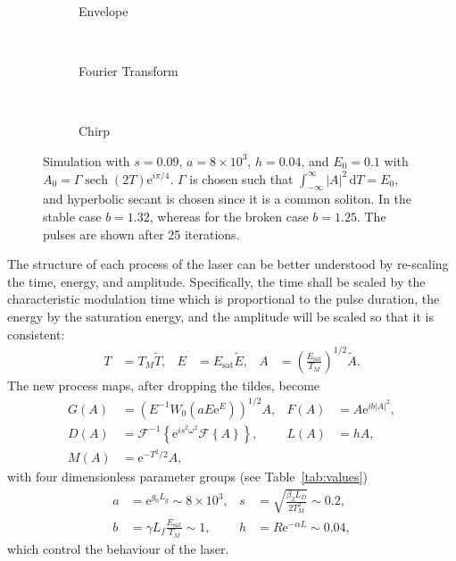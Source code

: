 \documentclass[%
 aps,
 jmp,%
 amsmath,amssymb,
 reprint,%
nofootinbib
]{revtex4-1}
\newcommand{\Es}{E_{\textrm{sat}}}
\newcommand{\FT}[1]{\mathcal{F}\left\{ #1 \right\}}
\newcommand{\FTi}[1]{\mathcal{F}^{-1}\left\{ #1 \right\}}
\DeclareMathOperator{\sech}{sech}
\begin{document}
\begin{figure}[tbp]
\centering
\begin{subfigure}[]{\columnwidth}

\caption{Envelope}
\label{fig:envelope}
\end{subfigure} \\
\begin{subfigure}[]{\columnwidth}

\caption{Fourier Transform}
\label{fig:fourier}
\end{subfigure} \\
\begin{subfigure}[]{\columnwidth}

\caption{Chirp}
\end{subfigure}
\caption{Simulation with $s = 0.09$, $a = 8 \times 10^3$, $h = 0.04$, and $E_0 = 0.1$ with $A_0 = \Gamma \sech{(2T)} \textrm{e}^{i \pi / 4}$. $\Gamma$ is chosen such that $\int_{-\infty}^\infty |A|^2 \, \textrm{d}T = E_0$, and hyperbolic secant is chosen since it is a common soliton. In the stable case $b = 1.32$, whereas for the broken case $b = 1.25$. The pulses are shown after 25 iterations.}
\label{fig:pulse}
\end{figure}

The structure of each process of the laser can be better understood by re-scaling the time, energy, and amplitude. Specifically, the time shall be scaled by the characteristic modulation time which is proportional to the pulse duration, the energy by the saturation energy, and the amplitude will be scaled so that it is consistent:
\begin{align*}
	T &= T_M \widetilde{T},& E &= \Es \widetilde{E},& A &= \left( \frac{\Es}{T_M} \right)^{1/2} \widetilde{A}.
\end{align*}
The new process maps, after dropping the tildes, become
\begin{align*}
	G(A) &= \left(E^{-1} W_0 \left( a E \textrm{e}^{E}\right) \right)^{1/2} A,&
	F(A) &= A \textrm{e}^{i b |A|^2}, \\
	D(A) &= \FTi{\textrm{e}^{i s^2 \omega^2} \FT{A}},&
	L(A) &= h A, \\
	M(A) &= \textrm{e}^{-T^2 / 2} A,
\end{align*}
with four dimensionless parameter groups (see Table~\ref{tab:values})
\begin{align*}
	a &= \textrm{e}^{g_0 L_g} \sim 8 \times 10^3,& s &= \sqrt{\frac{\beta_2 L_D}{2 T_M^2}} \sim 0.2, \\
	b &= \gamma L_f \frac{\Es}{T_M} \sim 1,& h &= R \textrm{e}^{-\alpha L} \sim 0.04,
\end{align*}
which control the behaviour of the laser.
\end{document}
